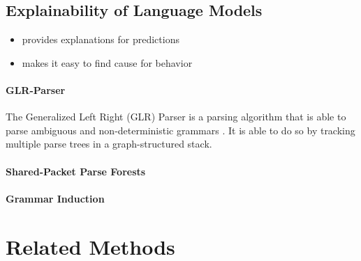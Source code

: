 \documentclass[10pt]{report}
\begin{document}
\subsection{Explainability of Language Models}
\begin{itemize}
    \item provides explanations for predictions
    \item makes it easy to find cause for behavior
\end{itemize}
\paragraph{GLR-Parser}
The Generalized Left Right (GLR) Parser is a parsing algorithm that is able to parse 
ambiguous
and non-deterministic grammars \cite{lang1974deterministic}. It is able to do so by tracking multiple parse trees in a graph-structured stack.
\paragraph{Shared-Packet Parse Forests}

\paragraph{Grammar Induction}

\section{Related Methods}
\end{document}
